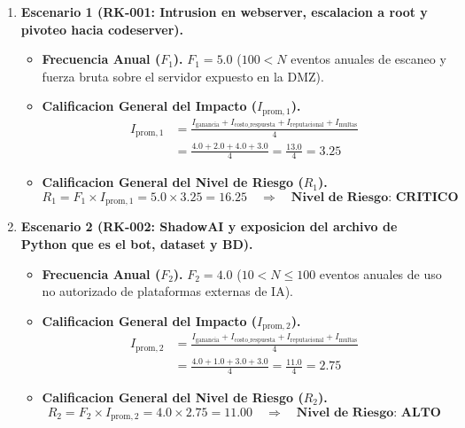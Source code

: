 \documentclass[letterpaper,11pt]{article}
\begin{document}
\begin{enumerate}[leftmargin=1.5cm]
    \item \textbf{Escenario 1 (RK-001: Intrusion en webserver, escalacion a root y pivoteo hacia codeserver).}
    \begin{itemize}[noitemsep,topsep=2pt]
        \item \textbf{Frecuencia Anual ($F_1$).} $F_1 = 5.0$ ($100 < N$ eventos anuales de escaneo y fuerza bruta sobre el servidor expuesto en la DMZ).
        \item \textbf{Calificacion General del Impacto ($I_{\text{prom},1}$).}
        \[
          \begin{aligned}
            I_{\text{prom},1} &= \frac{I_{\text{ganancia}} + I_{\text{costo\_respuesta}} + I_{\text{reputacional}} + I_{\text{multas}}}{4} \\
                        &= \frac{4.0 + 2.0 + 4.0 + 3.0}{4} = \frac{13.0}{4} = 3.25
          \end{aligned}
        \]
        \item \textbf{Calificacion General del Nivel de Riesgo ($R_1$).}
        \[
            R_1 = F_1 \times I_{\text{prom},1} = 5.0 \times 3.25 = 16.25 \quad \Longrightarrow \quad \textbf{Nivel de Riesgo: CRITICO}
        \]
    \end{itemize}

    \item \textbf{Escenario 2 (RK-002: ShadowAI y exposicion del archivo de Python que es el bot, dataset y BD).}
    \begin{itemize}[noitemsep,topsep=2pt]
        \item \textbf{Frecuencia Anual ($F_2$).} $F_2 = 4.0$ ($10 < N \leq 100$ eventos anuales de uso no autorizado de plataformas externas de IA).
        \item \textbf{Calificacion General del Impacto ($I_{\text{prom},2}$).}
        \[
          \begin{aligned}
            I_{\text{prom},2} &= \frac{I_{\text{ganancia}} + I_{\text{costo\_respuesta}} + I_{\text{reputacional}} + I_{\text{multas}}}{4} \\
                        &= \frac{4.0 + 1.0 + 3.0 + 3.0}{4} = \frac{11.0}{4} = 2.75
          \end{aligned}
        \]
        \item \textbf{Calificacion General del Nivel de Riesgo ($R_2$).}
        \[
            R_2 = F_2 \times I_{\text{prom},2} = 4.0 \times 2.75 = 11.00 \quad \Longrightarrow \quad \textbf{Nivel de Riesgo: ALTO}
        \]
    \end{itemize}
\end{enumerate}

\newpage
\nocite{*}
\printbibliography[heading=bibintoc, title={Referencias}]
\end{document}
